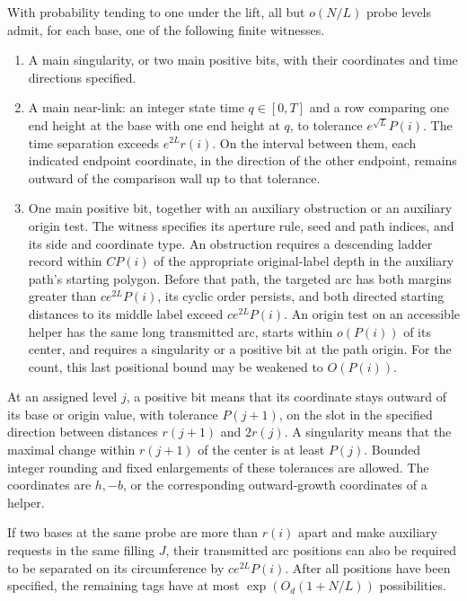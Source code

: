 \begin{lemma}\label{addr:finite-tests}
With probability tending to one under the lift, all but $o(N/L)$ probe
levels admit, for each base, one of the following finite witnesses.
\begin{enumerate}[label=\textup{(\roman*)}]
\item A main singularity, or two main positive bits, with their
coordinates and time directions specified.
\item A main near-link: an integer state time $q\in[0,T]$ and a row
comparing one end height at the base with one end height at $q$, to
tolerance $e^{\sqrt L}P(i)$.  The time separation exceeds
$e^{2L}r(i)$.  On the interval between them, each indicated endpoint
coordinate, in the direction of the other endpoint, remains outward of
the comparison wall up to that tolerance.
\item One main positive bit, together with an auxiliary obstruction or
an auxiliary origin test.  The witness specifies its aperture rule,
seed and path indices, and its side and coordinate type.  An obstruction
requires a descending ladder record within $CP(i)$ of the appropriate
original-label depth in the auxiliary path's starting polygon.  Before
that path, the targeted arc has both margins greater than
$ce^{2L}P(i)$, its cyclic order persists, and both directed starting
distances to its middle label exceed $ce^{2L}P(i)$.  An origin test on an
accessible helper has the same long transmitted arc, starts within
$o(P(i))$ of its center, and requires a singularity or a positive bit
at the path origin.  For the count, this last positional bound may be
weakened to $O(P(i))$.
\end{enumerate}
At an assigned level $j$, a positive bit means that its coordinate stays
outward of its base or origin value, with tolerance $P(j+1)$, on the
slot in the specified direction between distances $r(j+1)$ and
$2r(j)$.  A singularity means that the maximal change within
$r(j+1)$ of the center is at least $P(j)$.  Bounded integer rounding
and fixed enlargements of these tolerances are allowed.  The coordinates
are $h,-b$, or the corresponding outward-growth coordinates of a helper.

If two bases at the same probe are more than $r(i)$ apart and make
auxiliary requests in the same filling $J$, their transmitted arc
positions can also be required to be separated on its circumference by
$ce^{2L}P(i)$.  After all positions have been specified, the remaining
tags have at most $\exp(O_d(1+N/L))$ possibilities.
\end{lemma}

